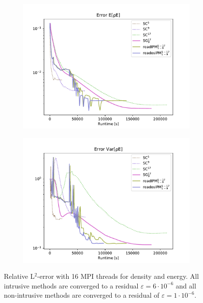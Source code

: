 \begin{figure}[h!]
	\begin{subfigure}{0.5\linewidth}
		\centering
				\includegraphics[width=\linewidth]{figs/Euler2D/L2_error_E[rhoE].pdf}
		\label{fig:sub1}
	\end{subfigure}%
	\begin{subfigure}{0.5\linewidth}
		\centering
				\includegraphics[width=\linewidth]{figs/Euler2D/L2_error_Var[rhoE].pdf}
		\label{fig:sub2}
	\end{subfigure}
	\caption{Relative L$^2$-error with 16 MPI threads for density and energy. All intrusive methods are converged to a residual $\varepsilon=6\cdot 10^{-6}$ and all non-intrusive methods are converged to a residual of $\varepsilon=1\cdot 10^{-6}$.}
	\label{fig:L2ErrorSolution2D}
\end{figure}
